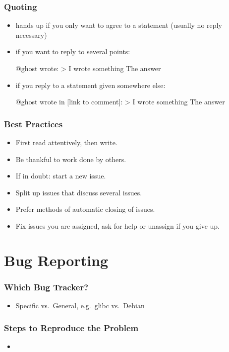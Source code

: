 \begin{frame}[fragile]
	\frametitle{Quoting}

	\begin{itemize}
	\item hands up if you only want to agree to a statement (usually no reply necessary)
	\item if you want to reply to several points:
		\begin{code}[gobble=8]
		@ghost wrote:
		> I wrote something
		The answer
		\end{code}
	\item if you reply to a statement given somewhere else:
		\begin{code}[gobble=8]
		@ghost wrote in [link to comment]:
		> I wrote something
		The answer
		\end{code}
	\end{itemize}
\end{frame}

\begin{frame}
	\frametitle{Best Practices}
	\begin{itemize}
		\item First read attentively, then write.
		\item Be thankful to work done by others.
		\item If in doubt: start a new issue.
		\item Split up issues that discuss several issues.
		\item Prefer methods of automatic closing of issues.
		\item Fix issues you are assigned, ask for help or unassign if you give up.
	\end{itemize}
\end{frame}

\section{Bug Reporting}

\begin{frame}
	\frametitle{Which Bug Tracker?}
	\begin{itemize}
		\item Specific vs.\ General, e.g.\ glibc vs.\ Debian
	\end{itemize}
\end{frame}

\begin{frame}
	\frametitle{Steps to Reproduce the Problem}
	\begin{itemize}
		\item 
	\end{itemize}
\end{frame}

